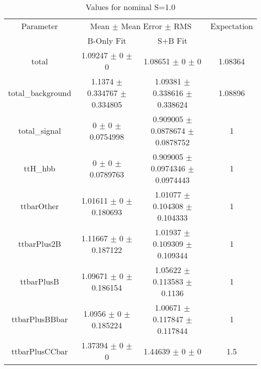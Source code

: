 \begin{table}
\centering
\caption{Values for nominal S=1.0}
\begin{tabular}{cccc}
\toprule
Parameter & \multicolumn{2}{c}{Mean $\pm$ Mean Error $\pm$ RMS} & Expectation\\
 & B-Only Fit & S+B Fit & \\
\midrule
total & \num{1.09247} $\pm$ \num{0} $\pm$ \num{0} & \num{1.08651} $\pm$ \num{0} $\pm$ \num{0} & \num{1.08364}\\
total\_background & \num{1.1374} $\pm$ \num{0.334767} $\pm$ \num{0.334805} & \num{1.09381} $\pm$ \num{0.338616} $\pm$ \num{0.338624} & \num{1.08896}\\
total\_signal & \num{0} $\pm$ \num{0} $\pm$ \num{0.0754998} & \num{0.909005} $\pm$ \num{0.0878674} $\pm$ \num{0.0878752} & \num{1}\\
ttH\_hbb & \num{0} $\pm$ \num{0} $\pm$ \num{0.0789763} & \num{0.909005} $\pm$ \num{0.0974346} $\pm$ \num{0.0974443} & \num{1}\\
ttbarOther & \num{1.01611} $\pm$ \num{0} $\pm$ \num{0.180693} & \num{1.01077} $\pm$ \num{0.104308} $\pm$ \num{0.104333} & \num{1}\\
ttbarPlus2B & \num{1.11667} $\pm$ \num{0} $\pm$ \num{0.187122} & \num{1.01937} $\pm$ \num{0.109309} $\pm$ \num{0.109344} & \num{1}\\
ttbarPlusB & \num{1.09671} $\pm$ \num{0} $\pm$ \num{0.186154} & \num{1.05622} $\pm$ \num{0.113583} $\pm$ \num{0.1136} & \num{1}\\
ttbarPlusBBbar & \num{1.0956} $\pm$ \num{0} $\pm$ \num{0.185224} & \num{1.00671} $\pm$ \num{0.117847} $\pm$ \num{0.117844} & \num{1}\\
ttbarPlusCCbar & \num{1.37394} $\pm$ \num{0} $\pm$ \num{0} & \num{1.44639} $\pm$ \num{0} $\pm$ \num{0} & \num{1.5}\\
\bottomrule
\end{tabular}
\end{table}